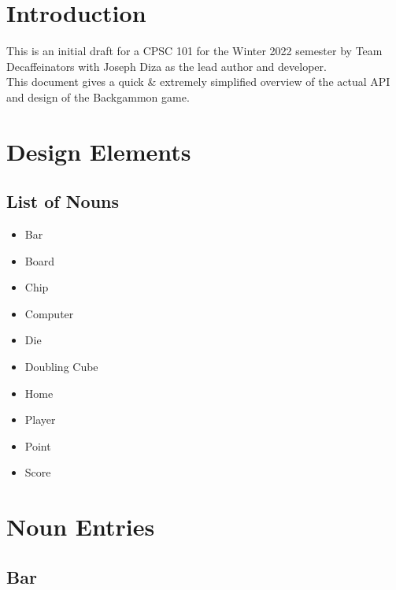 \documentclass{report}
\begin{document}

\tableofcontents

\chapter{Introduction}

This is an initial draft for a CPSC 101 for the Winter 2022 semester by Team Decaffeinators
with Joseph Diza as the lead author and developer.  \\

\noindent
This document gives a quick \& extremely simplified overview
of the actual API and design of the Backgammon game.

\chapter{Design Elements}

\section{List of Nouns}

\begin{multicols}{2}
    \begin{itemize}
        \item Bar
        \item Board
        \item Chip
        \item Computer
        \item Die
    \end{itemize}

    \begin{itemize}
        \item Doubling Cube
        \item Home
        \item Player
        \item Point
        \item Score
    \end{itemize}
\end{multicols}

\chapter{Noun Entries}

\section{Bar}
\end{document}
